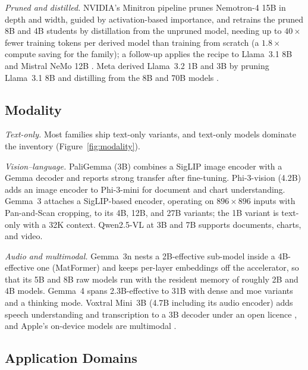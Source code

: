 \emph{Pruned and distilled.} NVIDIA's Minitron pipeline \citep{minitron2024} prunes Nemotron-4 15B in depth and width, guided by activation-based importance, and retrains the pruned 8B and 4B students by distillation from the unpruned model, needing up to $40\times$ fewer training tokens per derived model than training from scratch (a $1.8\times$ compute saving for the family); a follow-up applies the recipe to Llama~3.1 8B and Mistral NeMo 12B \citep{sreenivas2024llmpruning}. Meta derived Llama~3.2 1B and 3B by pruning Llama~3.1 8B and distilling from the 8B and 70B models \citep{meta2024llama32}.

\subsection{Modality}
\label{supp:taxonomy_modality}

\emph{Text-only.} Most families ship text-only variants, and text-only models dominate the inventory (Figure~\ref{fig:modality}).

\emph{Vision--language.} PaliGemma (3B) \citep{beyer2024paligemma} combines a SigLIP image encoder with a Gemma decoder and reports strong transfer after fine-tuning. Phi-3-vision (4.2B) \citep{abdin2024phi3} adds an image encoder to Phi-3-mini for document and chart understanding. Gemma~3 \citep{team2025gemma3} attaches a SigLIP-based encoder, operating on $896 \times 896$ inputs with Pan-and-Scan cropping, to its 4B, 12B, and 27B variants; the 1B variant is text-only with a 32K context. Qwen2.5-VL \citep{bai2025qwen25vl} at 3B and 7B supports documents, charts, and video.

\emph{Audio and multimodal.} Gemma~3n \citep{google2025gemma3n} nests a 2B-effective sub-model inside a 4B-effective one (MatFormer) and keeps per-layer embeddings off the accelerator, so that its 5B and 8B raw models run with the resident memory of roughly 2B and 4B models. Gemma~4 \citep{gemma4_2026} spans 2.3B-effective to 31B with dense and \gls{moe} variants and a thinking mode. Voxtral Mini~3B (4.7B including its audio encoder) adds speech understanding and transcription to a 3B decoder under an open licence \citep{mistral2025voxtral}, and Apple's on-device models are multimodal \citep{gunter2025afm,apple2026afm3}.

\subsection{Application Domains}
\label{supp:taxonomy_domain}

